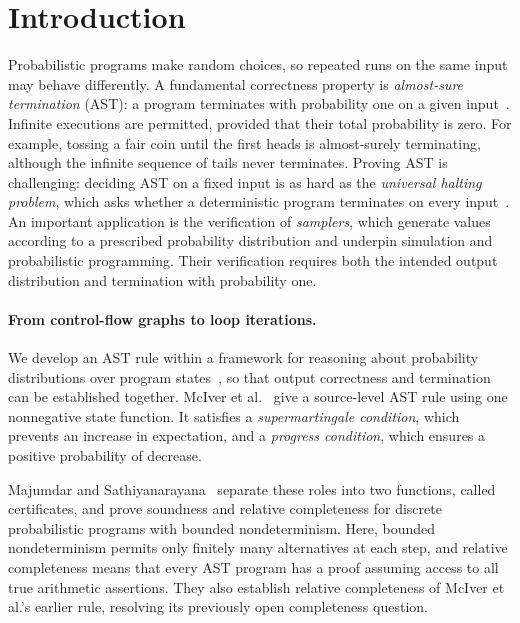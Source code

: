 \section{Introduction}
\label{sec:intro}

Probabilistic programs make random choices, so repeated runs on the same
input may behave differently. A fundamental correctness property is
\emph{almost-sure termination} (AST): a program terminates with probability
one on a given input~\cite{SahebDjahromi1978}. Infinite executions are permitted, provided
that their total probability is zero. For example, tossing a fair coin
until the first heads is almost-surely terminating, although the infinite
sequence of tails never terminates. Proving AST is challenging: deciding
AST on a fixed input is as hard as the \emph{universal halting problem},
which asks whether a deterministic program terminates on every
input~\cite{KaminskiKM2019}.
An important application is the verification of \emph{samplers}, which
generate values according to a prescribed probability distribution and
underpin simulation and probabilistic programming. Their verification
requires both the intended output distribution and termination with
probability one.

\paragraph{From control-flow graphs to loop iterations.}
We develop an AST rule within a framework for reasoning about probability
distributions over program states~\cite{zilken2026verifyingsamplingalgorithmsdistributional},
so that output correctness and termination can be established together.
McIver et al.~\cite{10.1145/3158121} give a source-level AST rule using one
nonnegative state function. It satisfies a \emph{supermartingale condition},
which prevents an increase in expectation, and a \emph{progress condition},
which ensures a positive probability of decrease.

Majumdar and Sathiyanarayana~\cite{DBLP:journals/pacmpl/MajumdarS25}
separate these roles into two functions, called certificates, and prove
soundness and relative completeness for discrete probabilistic programs
with bounded nondeterminism. Here, bounded nondeterminism permits only
finitely many alternatives at each step, and relative completeness means
that every AST program has a proof assuming access to all true arithmetic
assertions. They also establish relative completeness of McIver et al.'s
earlier rule, resolving its previously open completeness question.


